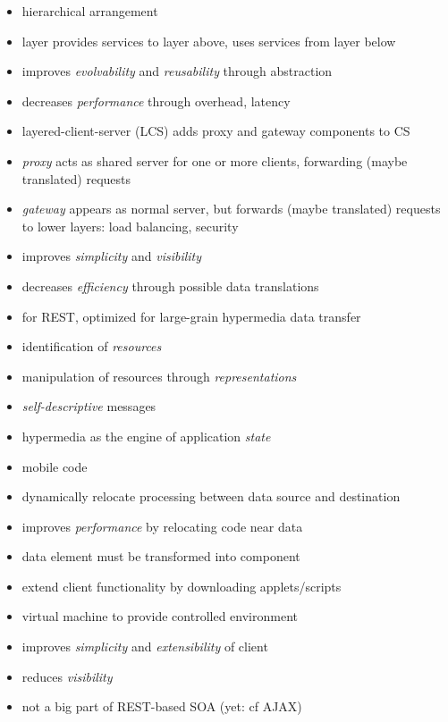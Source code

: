 \documentclass{sepslide-soa-faked} %
\begin{document}
\begin{slide}
\begin{itemize}
\item hierarchical arrangement
\item layer provides services to layer above, uses services from layer below
\item improves \emph{evolvability} and \emph{reusability} through abstraction
\item decreases \emph{performance} through overhead, latency
\bigskip
\item layered-client-server (LCS) adds proxy and gateway components to CS
\item \emph{proxy} acts as shared server for one or more clients, forwarding (maybe translated) requests
\item \emph{gateway} appears as normal server, but forwards (maybe translated) requests to lower layers: load balancing, security
\end{itemize}
\end{slide}

\begin{slide}
\begin{itemize}
\item improves \emph{simplicity} and \emph{visibility}
\item decreases \emph{efficiency} through possible data translations
\bigskip
\item for REST, optimized for large-grain hypermedia data transfer
\item identification of \emph{resources}
\item manipulation of resources through \emph{representations}
\item \emph{self-descriptive} messages
\item hypermedia as the engine of application \emph{state}
\end{itemize}
\end{slide}

\begin{slide}
\begin{itemize}
\item mobile code
\item dynamically relocate processing between data source and destination
\item improves \emph{performance} by relocating code near data
\item data element must be transformed into component
\bigskip
\item extend client functionality by downloading applets/scripts
\item virtual machine to provide controlled environment
\item improves \emph{simplicity} and \emph{extensibility} of client
\item reduces \emph{visibility}
\item not a big part of REST-based SOA (yet: cf AJAX)
\end{itemize}
\end{slide}
\end{document}
